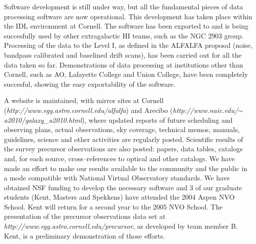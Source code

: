 Software development is still under way, but all the fundamental pieces of
data processing software are now operational. This development has taken 
place within the IDL environment at Cornell. The software has been exported 
to and is being succesfully used by
other extragalactic HI teams, such as the NGC 2903 group. Processing of the
data to the Level I, as defined in the ALFALFA proposal (noise, bandpass 
calibrated and baselined drift scans), has been carried out for all the data
taken so far. Demonstrations of data processing at institutions other than
Cornell, such as AO, Lafayette College and Union College, have been completely
succesful, showing the easy exportability of the software.

A website is maintained, with mirror sites at Cornell 
({\it http://www.egg.astro.cornell.edu/alfalfa}) and Arecibo 
({\it http://www.naic.edu/$\sim$a2010/galaxy\_a2010.html}), where updated reports
of future scheduling and observing plans, actual observations, sky coverage,
technical memos, manuals, guidelines, science and other activities are
regularly posted. Scientific results of the survey precursor observations
are also posted: papers, data tables, catalogs and, for each source, 
cross--references to optical and other catalogs. We have made an effort to
make our results available to the community and the public in a mode
compatible with National Virtual Observatory standards. We have
obtained NSF funding to develop the necessary software and 3 of our graduate
students (Kent, Masters and Spekkens) have attended the 2004 Aspen NVO School.
Kent will return for a second year to the 2005 NVO School.
The presentation of the precursor observations data set at
{\it http://www.egg.astro.cornell.edu/precursor}, as developed by team member
B. Kent, is a preliminary demonstration of those efforts.

